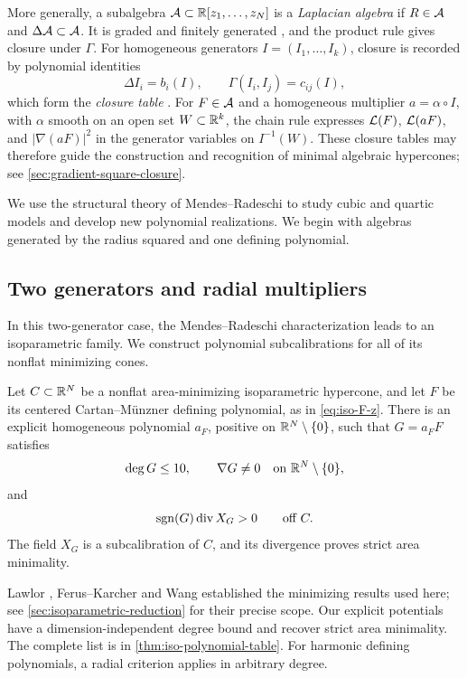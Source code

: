 More generally, a subalgebra \(\mathcal A\subset\mathbb R[z_1,\ldots,z_N]\) is
a \emph{Laplacian algebra} if \(R\in\mathcal A\) and
\(\Delta\mathcal A\subset\mathcal A\).
It is graded and finitely generated
\cite[Corollary~22 and Lemma~24]{MendesRadeschi}, and the product
rule gives closure under \(\Gamma\).
For homogeneous generators \(I=(I_1,\ldots,I_k)\), closure is
recorded by polynomial identities
\[
 \Delta I_i=b_i(I),\qquad
 \Gamma(I_i,I_j)=c_{ij}(I),
\]
which form the \emph{closure table}
\cite[Proposition~37(a)]{MendesRadeschi}.
For \(F\in\mathcal A\) and a homogeneous multiplier \(a=\alpha\circ I\),
with \(\alpha\) smooth on an open set \(W\subset\mathbb R^k\), the chain
rule expresses \(\mathcal L(F)\), \(\mathcal L(aF)\), and \(|\nabla(aF)|^2\)
in the generator variables on \(I^{-1}(W)\).
These closure tables may therefore guide the construction and
recognition of minimal algebraic hypercones; see
\cref{sec:gradient-square-closure}.

We use the structural theory of Mendes--Radeschi
\cite{MendesRadeschi,MendesRadeschiQuadratic,MendesRadeschiMaximality}
to study cubic and quartic models and develop new polynomial realizations.
We begin with algebras generated by the radius squared and one
defining polynomial.

\subsection{Two generators and radial multipliers}

In this two-generator case, the Mendes--Radeschi characterization
\cite[Proposition~37(c)]{MendesRadeschi} leads to an isoparametric
family. We construct polynomial subcalibrations for all of its
nonflat minimizing cones.

\begin{maintheorem}
\label{main:isoparametric}
Let $C\subset\mathbb R^N$ be a nonflat area-minimizing isoparametric hypercone,
and let $F$ be its centered Cartan--M\"unzner defining polynomial, as
in \eqref{eq:iso-F-z}. There is an explicit homogeneous polynomial
$a_F$, positive on $\mathbb R^N\setminus\{0\}$, such that $G=a_FF$ satisfies
\[
 \deg G\le10,\qquad \nabla G\ne0
 \quad\text{on }\mathbb R^N\setminus\{0\},
\]
and
\[
 \operatorname{sgn}(G)\operatorname{div} X_G>0\qquad\text{off }C.
\]
The field $X_G$ is a subcalibration of $C$, and its divergence proves
strict area minimality.
\end{maintheorem}
Lawlor \cite{Lawlor91}, Ferus--Karcher \cite{FerusKarcher85} and
Wang \cite{Wang94} established the minimizing results used here;
see \cref{sec:isoparametric-reduction} for their precise scope.
Our explicit potentials have a dimension-independent degree bound
and recover strict area minimality. The complete list is in
\cref{thm:iso-polynomial-table}.
For harmonic defining polynomials, a radial criterion applies in
arbitrary degree.

